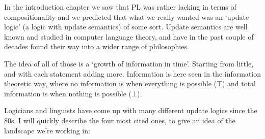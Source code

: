 \documentclass[12pt]{article}
\begin{document}
In the introduction chapter we saw that PL was rather lacking in terms of compositionality and we predicted that what we really wanted was an `update logic' (a logic with update semantics) of some sort. Update semantics are well known and studied in computer language theory, and have in the past couple of decades found their way into a wider range of philosophies.

The idea of all of those is a `growth of information in time'. Starting from little, and with each statement adding more. Information is here seen in the information theoretic way, where no information is when everything is possible ($\top$) and total information is when nothing is possible ($\bot$).

Logicians and linguists have come up with many different update logics since the 80s. I will quickly describe the four most cited ones, to give an idea of the landscape we're working in:
%
\end{document}
